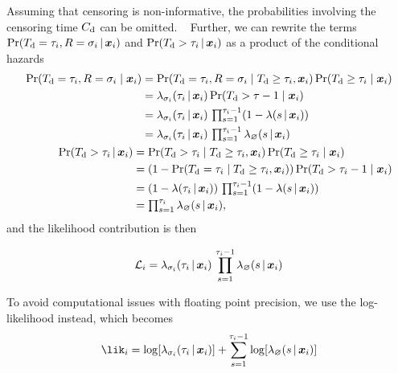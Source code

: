 Assuming that censoring is non-informative, 
the probabilities involving the censoring time \({C_{\mathrm{d}}}\) can be omitted.
~\autocite{tutzModeling2016}
Further, we can rewrite the terms 
\(\Pr({T_{\mathrm{d}}} = \tau_{i}, R = \sigma_i \,|\, \bm{x}_i)\) and 
\(\Pr({T_{\mathrm{d}}} > \tau_{i} \,|\, \bm{x}_i) \) 
as a product of the conditional hazards
\begin{align}
\begin{split}
    \Pr(\Tid = \tid_{i}, R = \sigma_i \mid \vec{x}_i) 
    &= 
    \PR (\Tid = \tid_{i}, R = \sigma_{i} \mid \Tid \geq \tid_{i}, \vec{x}_i) 
    \PR (\Tid  \geq \tid_i \mid \vec{x}_i) \\
    &= \lambda_{\sigma_i}(\tid_i \giv \vec{x}_i) \PR (\Tid  > \tid - 1 \mid \vec{x}_i) \\
    &= \lambda_{\sigma_i}(\tid_i \giv \vec{x}_i) \, 
    \textstyle \prod_{s=1}^{\tid_i - 1} (1 - \lambda(s \giv \vec{x}_i)) \\
    &= \lambda_{\sigma_i}(\tid_i \giv \vec{x}_i) \, 
    \textstyle \prod_{s=1}^{\tid_i - 1} \lambda_\varnothing(s \giv \vec{x}_i)
    \raisetag{2em}
\end{split} \\
\begin{split}
    \Pr(\Tid > \tid_{i} \giv \vec{x}_i) 
    &= 
    \PR (\Tid > \tid_{i} \mid \Tid \geq \tid_{i}, \vec{x}_i) 
    \PR (\Tid  \geq \tid_i \mid \vec{x}_i) \\
    &= 
    (1 - \PR (\Tid = \tid_{i}  \mid \Tid \geq \tid_{i}, \vec{x}_i)) 
    \PR (\Tid  > \tid_i - 1 \mid \vec{x}_i) \\
    &= (1 - \lambda(\tid_i \giv \vec{x}_i)) \, 
    \textstyle \prod_{s=1}^{\tid_i - 1} (1 - \lambda(s \giv \vec{x}_i)) \\
    &= \textstyle \prod_{s=1}^{\tid_i} \lambda_\varnothing(s \giv \vec{x}_i)
    \raisetag{2em},
\end{split} 
\end{align}
and the likelihood contribution is then

\begin{equation}
    \mathcal{L}_{i} =
        \lambda_{\sigma_i}(\tau_i \,|\, \bm{x}_i) \, 
        \prod_{s=1}^{\tau_i - 1} \lambda_\varnothing(s \,|\, \bm{x}_i)
\end{equation}

To avoid computational issues with floating point precision, 
we use the log-likelihood instead, which becomes
\begin{equation}
    \lik_{i} =
        \log [\lambda_{\sigma_i}(\tid_i \giv \vec{x}_i)] +
        \sum_{s=1}^{\tid_i - 1} \log [\lambdanull{s}]
\end{equation}

